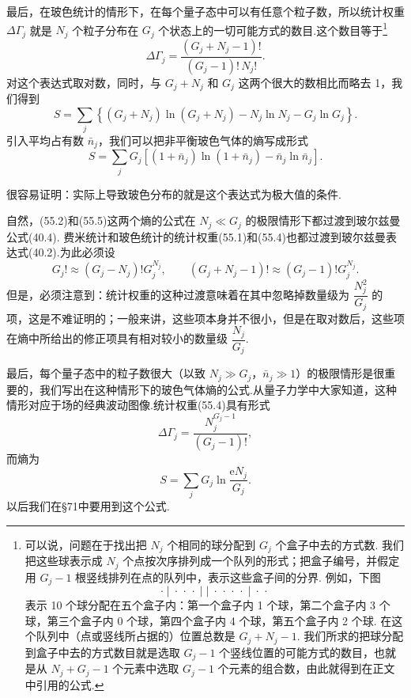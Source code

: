 最后，在玻色统计的情形下，在每个量子态中可以有任意个粒子数，所以统计权重 $\Delta\varGamma_j$ 就是 $N_j$ 个粒子分布在 $G_j$ 个状态上的一切可能方式的数目.这个数目等于\footnote{可以说，问题在于找出把 $N_j$ 个相同的球分配到 $G_j$ 个盒子中去的方式数. 我们把这些球表示成 $N_j$ 个点按次序排列成一个队列的形式；把盒子编号，并假定用 $G_j-1$ 根竖线排列在点的队列中，表示这些盒子间的分界. 例如，下图
\begin{equation*}
  \cdot\;\big|\;\cdot\,\cdot\,\cdot\;\big|\;\big|\;\cdot\,\cdot\,\cdot\,\cdot\;\big|\;\cdot\,\cdot
\end{equation*}
表示 10 个球分配在五个盒子内：第一个盒子内 1 个球，第二个盒子内 3 个球，第三个盒子内 0 个球，第四个盒子内 4 个球，第五个盒子内 2 个球. 在这个队列中（点或竖线所占据的）位置总数是 $G_j+N_j-1$. 我们所求的把球分配到盒子中去的方式数目就是选取 $G_j-1$ 个竖线位置的可能方式的数目，也就是从 $N_j+G_j-1$ 个元素中选取 $G_j-1$ 个元素的组合数，由此就得到在正文中引用的公式.}
\begin{equation}
  \Delta\varGamma_j=\frac{\left(G_j+N_j-1\right)!}{\left(G_j-1\right)!\,N_j!}.
\end{equation}
对这个表达式取对数，同时，与 $G_j+N_j$ 和 $G_j$ 这两个很大的数相比而略去 1，我们得到
\begin{equation}
  S=\sum_j\left\{\left(G_j+N_j\right)\ln\left(G_j+N_j\right)-N_j\ln N_j-G_j\ln G_j\right\}.
\end{equation}
引入平均占有数 $\bar{n}_j$，我们可以把非平衡玻色气体的熵写成形式
\begin{equation}
  S=\sum_jG_j\left[\left(1+\bar{n}_j\right)\ln\left(1+\bar{n}_j\right)-\bar{n}_j\ln\bar{n}_j\right].
\end{equation}

很容易证明：实际上导致玻色分布的就是这个表达式为极大值的条件.

自然，(55.2)和(55.5)这两个熵的公式在 $N_j\ll G_j$ 的极限情形下都过渡到玻尔兹曼公式(40.4). 费米统计和玻色统计的统计权重(55.1)和(55.4)也都过渡到玻尔兹曼表达式(40.2).为此必须设
\begin{equation*}
  G_j!\approx\left(G_j-N_j\right)!G_j^{N_j},\qquad
  \left(G_j+N_j-1\right)!\approx\left(G_j-1\right)!G_j^{N_j}.
\end{equation*}
但是，必须注意到：统计权重的这种过渡意味着在其中忽略掉数量级为 $\dfrac{N_j^2}{G_j}$ 的项，这是不难证明的；一般来讲，这些项本身并不很小，但是在取对数后，这些项在熵中所给出的修正项具有相对较小的数量级 $\dfrac{N_j}{G_j}$.

最后，每个量子态中的粒子数很大（以致 $N_j\gg G_j$，$\bar{n}_j\gg1$）的极限情形是很重要的，我们写出在这种情形下的玻色气体熵的公式.从量子力学中大家知道，这种情形对应于场的经典波动图像.统计权重(55.4)具有形式
\begin{equation}
  \Delta\varGamma_j=\frac{N_j^{G_j-1}}{\left(G_j-1\right)!},
\end{equation}
而熵为
\begin{equation}
  S=\sum_jG_j\ln\frac{\mathrm{e}N_j}{G_j}.
\end{equation}
以后我们在§71中要用到这个公式.


